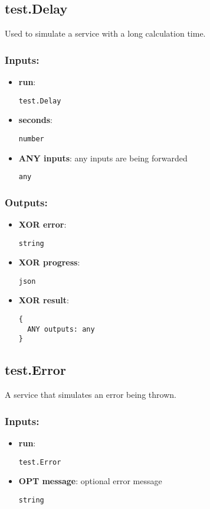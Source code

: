\subsection{test.Delay}
\label{ch:builtinservices:test.Delay}
Used to simulate a service with a long calculation time.
\subsubsection*{Inputs:}
\begin{itemize}
  \small
    \item \textbf{run}: 
\begin{lstlisting}
test.Delay
\end{lstlisting}
    \item \textbf{seconds}: 
\begin{lstlisting}
number
\end{lstlisting}
    \item \textbf{ANY inputs}: any inputs are being forwarded
\begin{lstlisting}
any
\end{lstlisting}
  \end{itemize}
\subsubsection*{Outputs:}
\begin{itemize}
  \small
    \item \textbf{XOR error}: 
\begin{lstlisting}
string
\end{lstlisting}
    \item \textbf{XOR progress}: 
\begin{lstlisting}
json
\end{lstlisting}
    \item \textbf{XOR result}: 
\begin{lstlisting}
{
  ANY outputs: any
}
\end{lstlisting}
  \end{itemize}

\subsection{test.Error}
\label{ch:builtinservices:test.Error}
A service that simulates an error being thrown.
\subsubsection*{Inputs:}
\begin{itemize}
  \small
    \item \textbf{run}: 
\begin{lstlisting}
test.Error
\end{lstlisting}
    \item \textbf{OPT message}: optional error message
\begin{lstlisting}
string
\end{lstlisting}
  \end{itemize}
